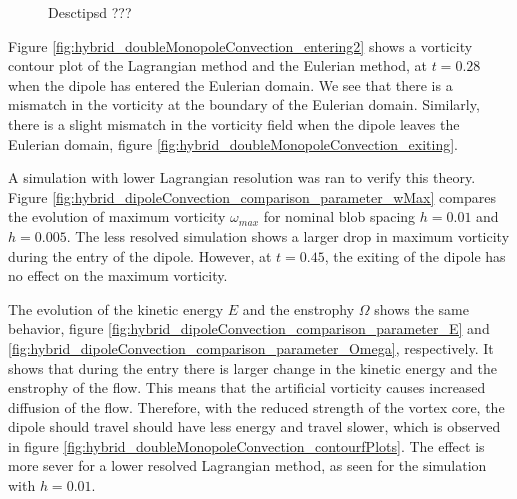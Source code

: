 \begin{figure}[!h]
     \caption{Desctipsd ???}
     \label{fig:hybrid_doubleMonopoleConvection_ent_exi}
	\end{figure}

Figure \ref{fig:hybrid_doubleMonopoleConvection_entering2} shows a vorticity contour plot of the Lagrangian method and the Eulerian method, at $t=0.28$ when the dipole has entered the Eulerian domain. We see that there is a mismatch in the vorticity at the boundary of the Eulerian domain. Similarly, there is a slight mismatch in the vorticity field when the dipole leaves the Eulerian domain, figure \ref{fig:hybrid_doubleMonopoleConvection_exiting}.

A simulation with lower Lagrangian resolution was ran to verify this theory. Figure \ref{fig:hybrid_dipoleConvection_comparison_parameter_wMax} compares the evolution of maximum vorticity $\omega_{max}$ for nominal blob spacing $h=0.01$ and $h=0.005$. The less resolved simulation shows a larger drop in maximum vorticity during the entry of the dipole. However, at $t=0.45$, the exiting of the dipole has no effect on the maximum vorticity. 

The evolution of the kinetic energy $E$ and the enstrophy $\Omega$ shows the same behavior, figure \ref{fig:hybrid_dipoleConvection_comparison_parameter_E} and  \ref{fig:hybrid_dipoleConvection_comparison_parameter_Omega}, respectively. It shows that during the entry there is larger change in the kinetic energy and the enstrophy of the flow. This means that the artificial vorticity causes increased diffusion of the flow. Therefore, with the reduced strength of the vortex core, the dipole should travel should have less energy and travel slower, which is observed in figure \ref{fig:hybrid_doubleMonopoleConvection_contourfPlots}. The effect is more sever for a lower resolved Lagrangian method, as seen for the simulation with $h=0.01$.

